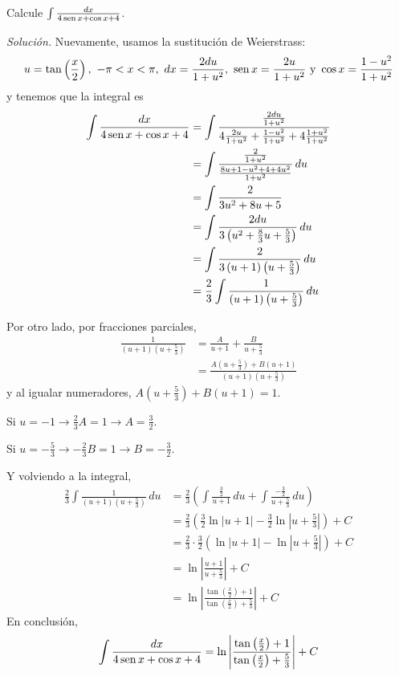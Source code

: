 \begin{ejemplo}
  Calcule $\int \frac{dx}{4\operatorname{sen} x+\cos x+4}$.
\end{ejemplo}
\emph{Solución.} Nuevamente, usamos la sustitución de Weierstrass:
\begin{gather*}
  u=\tan \left( \frac{x}{2}\right),\ -\pi<x<\pi,\ dx=\frac{2du}{1+u^{2}},\ \operatorname{sen} x=\frac{2u}{1+u^{2}}\text{ y }\cos x=\frac{1-u^{2}}{1+u^{2}}
\end{gather*}
y tenemos que la integral es
\begin{gather*}
  \begin{aligned}
    \int \frac{dx}{4\sen x+\cos x+4}&=\int \frac{\frac{2du}{1+u^{2}}}{4\frac{2u}{1+u^{2}}+\frac{1-u^{2}}{1+u^{2}}%
    +4\frac{1+u^{2}}{1+u^{2}}}\\
    &=\int \frac{\frac{2}{1+u^{2}}}{\frac{8u+1-u^{2}+4+4u^{2}}{1+u^{2}}}\, du\\
    &=\int \frac{2}{3u^{2}+8u+5}\\
    &=\int \frac{2du}{3\left( u^{2}+\frac{8}{3}u+\frac{5}{3}\right) }\, du\\
    &=\int \frac{2}{3\left( u+1\right) \left( u+\frac{5}{3}\right) }\, du \\
    &=\frac{2}{3}\int \frac{1}{\left( u+1\right) \left( u+\frac{5}{3}\right) }\, du
  \end{aligned}
\end{gather*}

Por otro lado, por fracciones parciales,
\begin{align*}
  \frac{1}{\left( u+1\right) \left( u+\frac{5}{3}\right) }&=\frac{A}{u+1}
  +\frac{B}{u+\frac{5}{3}}\\
  &=\frac{A\left( u+\frac{5}{3}\right) +B\left(u+1\right) }{\left( u+1\right) \left( u+\frac{5}{3}\right) }
\end{align*}
y al igualar numeradores, $A\left( u+\frac{5}{3}\right) +B\left( u+1\right) =1.$

Si $u=-1\rightarrow \frac{2}{3}A=1\rightarrow A=\frac{3}{2}$.

Si $u=-\frac{5}{3}\rightarrow -\frac{2}{3}B=1\rightarrow B=-\frac{3}{2}$.

Y volviendo a la integral,
\begin{align*}
  \frac{2}{3}\int \frac{1}{(u+1)(u+\frac{5}{3})} \, du
  &= \frac{2}{3}\left( \int \frac{\frac{3}{2}}{u+1} \, du + \int \frac{-\frac{3}{2}}{u+\frac{5}{3}} \, du \right) \\
  &= \frac{2}{3}\left( \frac{3}{2}\ln\left|u+1\right| - \frac{3}{2}\ln\left|u+\frac{5}{3}\right| \right) + C \\
  &= \frac{2}{3} \cdot \frac{3}{2} \left( \ln\left|u+1\right| - \ln\left|u+\frac{5}{3}\right| \right) + C \\
  &= \ln\left| \frac{u+1}{u+\frac{5}{3}} \right| + C\\
  &= \ln\left| \frac{\tan\left(\frac{x}{2}\right)+1}{\tan\left(\frac{x}{2}\right)+\frac{5}{3}} \right| + C
\end{align*}
En conclusión,
\[
  \int \frac{dx}{4\operatorname{sen} x+\cos x+4}=\ln \left\vert \frac{\tan \left( \frac{x}{2}\right) +1}{\tan
  \left( \frac{x}{2}\right) +\frac{5}{3}}\right\vert +C
\]

